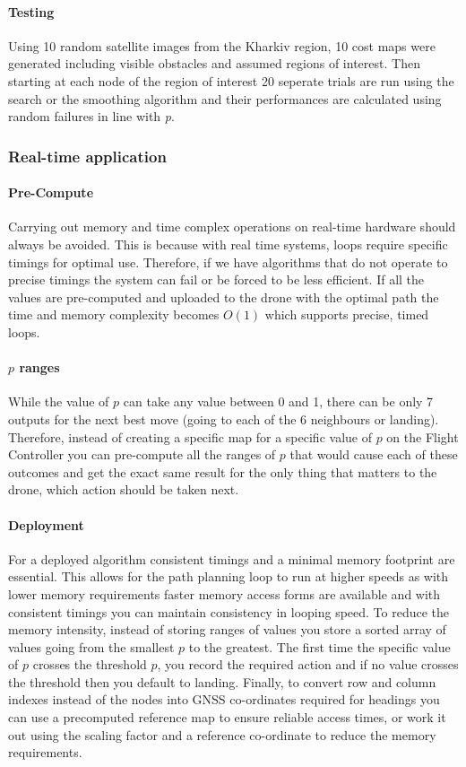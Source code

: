 \paragraph{Testing}
Using 10 random satellite images from the Kharkiv region, 10 cost maps were generated including visible obstacles and assumed regions of interest. Then starting at each node of the region of interest 20 seperate trials are run using the search or the smoothing algorithm and their performances are calculated using random failures in line with \textit{p}.

\subsubsection{Real-time application}
\paragraph{Pre-Compute}
Carrying out memory and time complex operations on real-time hardware should always be avoided. This is because with real time systems, loops require specific timings for optimal use. Therefore, if we have algorithms that do not operate to precise timings the system can fail or be forced to be less efficient. If all the values are pre-computed and uploaded to the drone with the optimal path the time and memory complexity becomes $O(1)$ which supports precise, timed loops. 
\paragraph{$p$ ranges}
While the value of $p$ can take any value between 0 and 1, there can be only 7 outputs for the next best move (going to each of the 6 neighbours or landing). Therefore, instead of creating a specific map for a specific value of $p$ on the Flight Controller you can pre-compute all the ranges of $p$ that would cause each of these outcomes and get the exact same result for the only thing that matters to the drone, which action should be taken next.
\paragraph{Deployment}
For a deployed algorithm consistent timings and a minimal memory footprint are essential. This allows for the path planning loop to run at higher speeds as with lower memory requirements faster memory access forms are available and with consistent timings you can maintain consistency in looping speed. To reduce the memory intensity, instead of storing ranges of values you store a sorted array of values going from the smallest $p$ to the greatest. The first time the specific value of $p$ crosses the threshold $p$, you record the required action and if no value crosses the threshold then you default to landing. Finally, to convert row and column indexes instead of the nodes into \gls{GNSS} co-ordinates required for headings you can use a precomputed reference map to ensure reliable access times, or work it out using the scaling factor and a reference co-ordinate to reduce the memory requirements.

